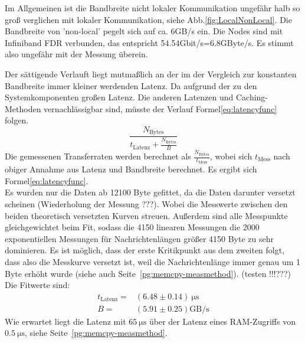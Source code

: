 \documentclass[12pt,a4paper]{article}
\begin{document}
Im Allgemeinen ist die Bandbreite nicht lokaler Kommunikation ungefähr halb so groß verglichen mit lokaler Kommunikation, siehe Abb.\ref{fig:LocalNonLocal}. Die Bandbreite von 'non-local' pegelt sich auf ca. 6GB/s ein. Die Nodes sind mit Infiniband FDR verbunden, das entspricht 54.54Gbit/s=6.8GByte/s. Es stimmt also ungefähr mit der Messung überein.\\

\label{pg:latencyfunc}

Der sättigende Verlauft liegt mutmaßlich an der im der Vergleich zur konstanten Bandbreite immer kleiner werdenden Latenz. Da aufgrund der zu den Systemkomponenten großen Latenz. Die anderen Latenzen und Caching-Methoden vernachlässigbar sind, müsste der Verlauf Formel\ref{eq:latencyfunc} folgen. \\
\begin{equation}
	\label{eq:latencyfunc}
	\frac{N_\text{Bytes}}{t_\text{Latenz}+\frac{N_\text{Bytes}}{B}}
\end{equation}
Die gemessenen Transferraten werden berechnet als $\frac{N_\text{Bytes}}{t_\text{Mess}}$, wobei sich $t_\text{Mess}$ nach obiger Annahme aus Latenz und Bandbreite berechnet. Es ergibt sich Formel\ref{eq:latencyfunc}.\\

Es wurden nur die Daten ab 12100 Byte gefittet, da die Daten darunter versetzt scheinen (Wiederholung der Messung ???). Wobei die Messwerte zwischen den beiden theoretisch versetzten Kurven streuen. Außerdem sind alle Messpunkte gleichgewichtet beim Fit, sodass die 4150 linearen Messungen die 2000 exponentiellen Messungen für Nachrichtenlängen größer 4150 Byte zu sehr dominieren. Es ist möglich, dass der erste Kritikpunkt aus dem zweiten folgt, dass also die Messkurve versetzt ist, weil die Nachrichtenlänge immer genau um 1 Byte erhöht wurde (siehe auch Seite~\ref{pg:memcpy-measmethod}). (testen !!!???) Die Fitwerte sind:\\
\begin{eqnarray}
	t_\text{Latenz}  =& (6.48 \pm 0.14) \SI{}{\micro\second} \\
	B                =& ( 5.91 \pm 0.25) \text{GB/s}
\end{eqnarray}
Wie erwartet liegt die Latenz mit $\SI{65}{\micro\second}$ über der Latenz eines RAM-Zugriffs von $\SI{0.5}{\micro\second}$, siehe Seite~\ref{pg:memcpy-measmethod}.


\end{document}
